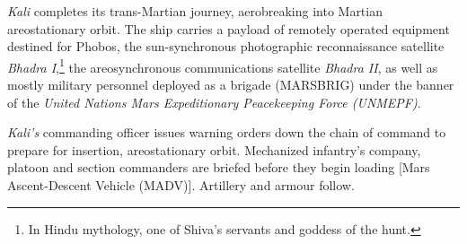 {\it Kali} completes its trans-Martian journey, aerobreaking into Martian areostationary orbit. The ship carries a payload of remotely operated equipment destined for Phobos, the sun-synchronous photographic reconnaissance satellite {\it Bhadra I},\footnote{In Hindu mythology, one of Shiva's servants and goddess of the hunt.} the areosynchronous communications satellite {\it Bhadra II}, as well as mostly military personnel deployed as a brigade (MARSBRIG) under the banner of the {\it United Nations Mars Expeditionary Peacekeeping Force (UNMEPF)}.
\StopTimelineDate

{\it Kali's} commanding officer issues warning orders down the chain of command to prepare for insertion, areostationary orbit. Mechanized infantry's company, platoon and section commanders are briefed before they begin loading [Mars Ascent-Descent Vehicle (MADV)]. Artillery and armour follow.
\StopTimelineDate

